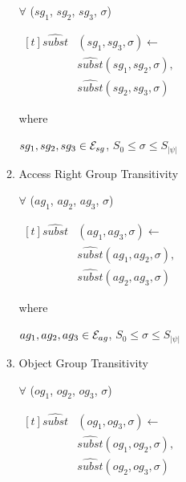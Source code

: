 \documentclass[global,twocolumn,draft]{svjour}
\begin{document}
\begin{itemize}
\begin{enumerate}
                  $\forall$ ($sg_{1}$, $sg_{2}$, $sg_{3}$, $\sigma$)

                  \begin{math}
                    \begin{aligned}[t]
                      \hat{subst}&(sg_{1}, sg_{3}, \sigma) \leftarrow \\
                      & \hat{subst}(sg_{1}, sg_{2}, \sigma), \\
                      & \hat{subst}(sg_{2}, sg_{3}, \sigma)
                    \end{aligned}
                  \end{math}

                  where
 
                  $sg_{1}, sg_{2}, sg_{3} \in {\cal E}_{sg}$,
                  $S_{0} \leq \sigma \leq S_{|\psi|}$
 
                \item
                  Access Right Group Transitivity
 
                  $\forall$ ($ag_{1}$, $ag_{2}$, $ag_{3}$, $\sigma$) 

                  \begin{math}
                    \begin{aligned}[t]
                      \hat{subst}&(ag_{1}, ag_{3}, \sigma) \leftarrow \\
                      & \hat{subst}(ag_{1}, ag_{2}, \sigma), \\
                      & \hat{subst}(ag_{2}, ag_{3}, \sigma)
                    \end{aligned}
                  \end{math}

                  where
 
                  $ag_{1}, ag_{2}, ag_{3} \in {\cal E}_{ag}$,
                  $S_{0} \leq \sigma \leq S_{|\psi|}$

                \item
                  Object Group Transitivity
 
                  $\forall$ ($og_{1}$, $og_{2}$, $og_{3}$, $\sigma$) 

                  \begin{math}
                    \begin{aligned}[t]
                      \hat{subst}&(og_{1}, og_{3}, \sigma) \leftarrow \\
                      & \hat{subst}(og_{1}, og_{2}, \sigma), \\
                      & \hat{subst}(og_{2}, og_{3}, \sigma)
                    \end{aligned}
                  \end{math}


\end{enumerate}
\end{itemize}
\end{document}
